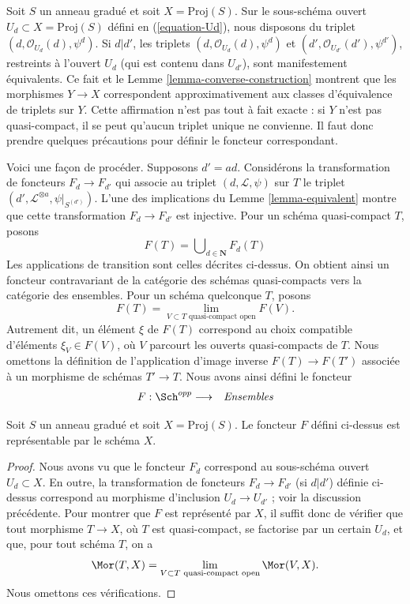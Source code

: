 \noindent
Soit $S$ un anneau gradué et soit $X = \text{Proj}(S)$. Sur le sous-schéma
ouvert $U_d \subset X = \text{Proj}(S)$ défini en (\ref{equation-Ud}), nous
disposons du triplet $(d, \mathcal{O}_{U_d}(d), \psi^d)$. Si $d | d'$, les
triplets $(d, \mathcal{O}_{U_d}(d), \psi^d)$ et
$(d', \mathcal{O}_{U_{d'}}(d'), \psi^{d'})$, restreints à l'ouvert $U_d$
(qui est contenu dans $U_{d'}$), sont
manifestement équivalents. Ce fait et le
Lemme \ref{lemma-converse-construction} montrent que les morphismes
$Y \to X$ correspondent approximativement aux classes d'équivalence de
triplets sur $Y$. Cette affirmation n'est pas tout à fait exacte : si $Y$
n'est pas quasi-compact, il se peut qu'aucun triplet unique ne convienne.
Il faut donc prendre quelques précautions pour définir le foncteur
correspondant.

\medskip\noindent
Voici une façon de procéder. Supposons
$d' = ad$. Considérons la transformation
de foncteurs $F_d \to F_{d'}$ qui associe au triplet
$(d, \mathcal{L}, \psi)$ sur $T$ le triplet
$(d', \mathcal{L}^{\otimes a}, \psi|_{S^{(d')}})$.
L'une des implications du Lemme \ref{lemma-equivalent} montre que cette
transformation $F_d \to F_{d'}$ est injective. Pour un schéma quasi-compact
$T$, posons
$$
F(T) = \bigcup\nolimits_{d \in \mathbf{N}} F_d(T)
$$
Les applications de transition sont celles décrites ci-dessus. On obtient
ainsi un foncteur contravariant de la
catégorie des schémas quasi-compacts vers
la catégorie des ensembles. Pour un schéma quelconque $T$, posons
$$
F(T)
=
\lim_{V \subset T\text{ quasi-compact open}} F(V).
$$
Autrement dit, un élément $\xi$ de $F(T)$ correspond au choix compatible
d'éléments $\xi_V \in F(V)$, où $V$ parcourt les ouverts quasi-compacts de
$T$. Nous omettons la définition de l'application d'image inverse
$F(T) \to F(T')$ associée à un morphisme de schémas $T' \to T$.
Nous avons ainsi défini le foncteur
\begin{eqnarray*}
F : \Sch^{opp} & \longrightarrow & \textit{Ensembles}
\end{eqnarray*}

\begin{lemma}
\label{lemma-proj-functor}
Soit $S$ un anneau gradué et soit
$X = \text{Proj}(S)$. Le foncteur $F$ défini
ci-dessus est représentable par le schéma $X$.
\end{lemma}

\begin{proof}
Nous avons vu que le foncteur $F_d$ correspond au sous-schéma ouvert
$U_d \subset X$. En outre, la transformation de foncteurs
$F_d \to F_{d'}$ (si $d | d'$) définie ci-dessus correspond au morphisme
d'inclusion $U_d \to U_{d'}$ ; voir la discussion précédente. Pour montrer
que $F$ est représenté par $X$, il suffit donc de vérifier que tout morphisme
$T \to X$, où $T$ est quasi-compact, se
factorise par un certain $U_d$, et que,
pour tout schéma $T$, on a
$$
\Mor(T, X)
=
\lim_{V \subset T\text{ quasi-compact open}} \Mor(V, X).
$$
Nous omettons ces vérifications.
\end{proof}







